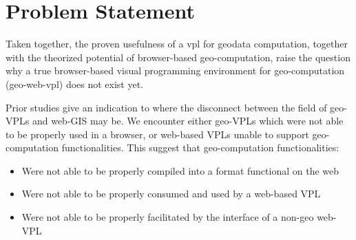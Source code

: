 







\section{Problem Statement}
Taken together, the proven usefulness of a vpl for geodata computation, together with the theorized potential of browser-based geo-computation, raise the question why a true browser-based visual programming environment for geo-computation (geo-web-vpl) does not exist yet.

Prior studies give an indication to where the disconnect between the field of geo-VPLs and web-GIS may be.  
We encounter either geo-VPLs which were not able to be properly used in a browser, or web-based VPLs unable to support geo-computation functionalities.
This suggest that geo-computation functionalities:
\begin{itemize}[-]
  \item Were not able to be properly compiled into a format functional on the web
  \item Were not able to be properly consumed and used by a web-based VPL
  \item Were not able to be properly facilitated by the interface of a non-geo web-VPL
\end{itemize}

